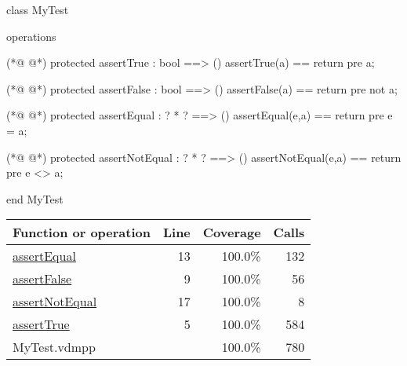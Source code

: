 \begin{vdmpp}[breaklines=true]
class MyTest

operations

(*@
\label{assertTrue:5}
@*)
 protected assertTrue : bool ==> ()
  assertTrue(a) == return
  pre a;
 
(*@
\label{assertFalse:9}
@*)
 protected assertFalse : bool ==> ()
  assertFalse(a) == return
  pre not a;
 
(*@
\label{assertEqual:13}
@*)
 protected assertEqual : ? * ? ==> ()
 assertEqual(e,a) == return
 pre e = a;
 
(*@
\label{assertNotEqual:17}
@*)
 protected assertNotEqual : ? * ? ==> ()
 assertNotEqual(e,a) == return
 pre e <> a;

end MyTest
\end{vdmpp}
\bigskip
\begin{longtable}{|l|r|r|r|}
\hline
Function or operation & Line & Coverage & Calls \\
\hline
\hline
\hyperref[assertEqual:13]{assertEqual} & 13&100.0\% & 132 \\
\hline
\hyperref[assertFalse:9]{assertFalse} & 9&100.0\% & 56 \\
\hline
\hyperref[assertNotEqual:17]{assertNotEqual} & 17&100.0\% & 8 \\
\hline
\hyperref[assertTrue:5]{assertTrue} & 5&100.0\% & 584 \\
\hline
\hline
MyTest.vdmpp & & 100.0\% & 780 \\
\hline
\end{longtable}

